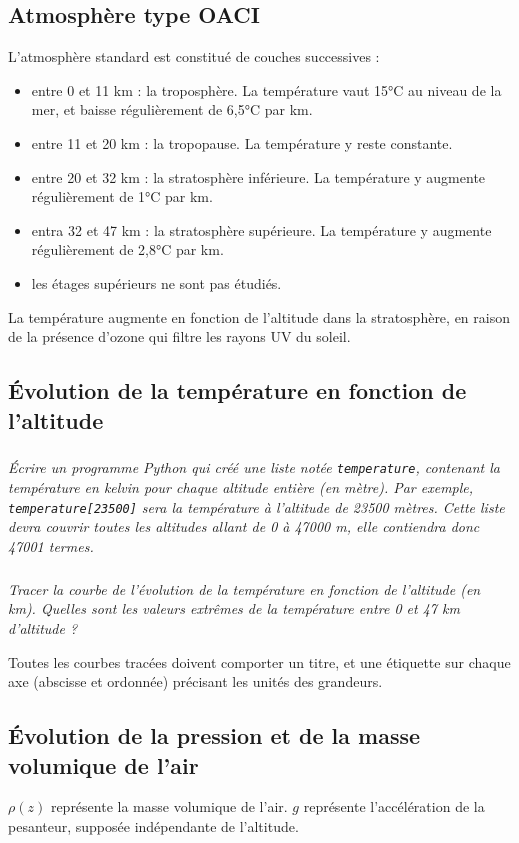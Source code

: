 \documentclass[10pt]{article}
\begin{document}
\subsection{Atmosphère type OACI}

L'atmosphère standard est constitué de couches successives :
\begin{itemize}
\item entre 0 et 11 km : la troposphère. La température vaut 15°C au niveau de la mer, et baisse régulièrement de 6,5°C par km.
\item entre 11 et 20 km : la tropopause. La température y reste constante.
\item entre 20 et 32 km : la stratosphère inférieure. La température y augmente régulièrement de 1°C par km.
\item entra 32 et 47 km : la stratosphère supérieure. La température y augmente régulièrement de 2,8°C par km.
\item les étages supérieurs ne sont pas étudiés.
\end{itemize}

\begin{rem}
La température augmente en fonction de l'altitude dans la stratosphère, en raison de la présence d'ozone qui filtre les rayons UV du soleil.
\end{rem}

\subsection{\'Evolution de la température en fonction de l'altitude}
\subparagraph{}
\textit{Écrire un programme Python qui créé une liste notée \texttt{temperature}, contenant la température en kelvin pour chaque altitude entière (en mètre). Par exemple, \texttt{temperature[23500]} sera la température à l'altitude de 23500 mètres. Cette liste devra couvrir toutes les altitudes allant de 0 à 47000 m, elle contiendra donc 47001 termes.}

\subparagraph{}
\textit{Tracer la courbe de l'évolution de la température en fonction de l'altitude (en km). Quelles sont les valeurs extrêmes de la température entre 0 et 47 km d'altitude ?}

\begin{rem}
Toutes les courbes tracées doivent comporter un titre, et une étiquette sur chaque axe (abscisse et ordonnée) précisant les unités des grandeurs.
\end{rem}

\subsection{\'Evolution de la pression et de la masse volumique de l'air}
$\rho(z)$ représente la masse volumique de l'air. $g$ représente l'accélération de la pesanteur, supposée indépendante de l'altitude.
\end{document}

